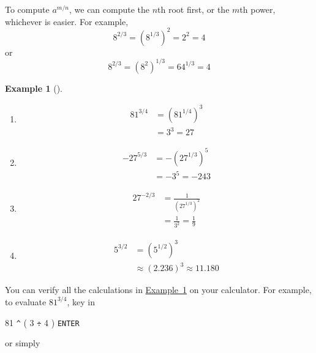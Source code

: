 \documentclass[10pt,]{book}
\theoremstyle{plain}
\theoremstyle{definition}
\theoremstyle{definition}
\theoremstyle{definition}
\newtheorem{example}[theorem]{Example}
\theoremstyle{definition}
\theoremstyle{definition}
\numberwithin{equation}{section}
\newcommand{\amp}{ & }
\begin{document}
    To compute \(a^{m/n}\), we can compute the \(n\)th root first, or the \(m\)th power, whichever is easier. For example,
    \begin{equation*}8^{2/3} = \left(8^{1/3}\right)^2 = 2^2 = 4\end{equation*}
    or
    \begin{equation*}8^{2/3} = \left(8^2\right)^{1/3} = 64^{1/3} = 4\end{equation*}
%
\begin{example}[]\label{example-rational-exponent}
\leavevmode%
\begin{enumerate}[label=*\alph**]
\item\hypertarget{li-521}{}\begin{align*}
            81^{3/4} \amp = \left(81^{1/4}\right)^3 \\
            \amp = 3^3 = 27
            \end{align*}
        \item\hypertarget{li-522}{}\begin{align*} 
            −27^{5/3} \amp = −\left(27^{1/3}\right)^5 \\
            \amp = −3^5 = −243
            \end{align*}
        \item\hypertarget{li-523}{}\begin{align*}
            27^{−2/3} \amp = \frac{1}{\left(27^{1/3}\right)^2} \\
            \amp = \frac{1}{3^2}= \frac{1}{9}
            \end{align*}
        \item\hypertarget{li-524}{}
            \begin{align*}
            5^{3/2} \amp = \left(5^{1/2}\right)^3 \\
            \amp \approx (2.236)^3 \approx 11.180
            \end{align*}
        \end{enumerate}
\end{example}
\par

    You can verify all the calculations in \hyperref[example-rational-exponent]{Example~\ref{example-rational-exponent}} on your calculator. For example, to evaluate \(81^{3/4}\), key in
%
\par

    81 \lstinline?^? ( 3 \lstinline?÷? 4 ) \lstinline?ENTER?
%
\par
or simply%
\par
\end{document}
